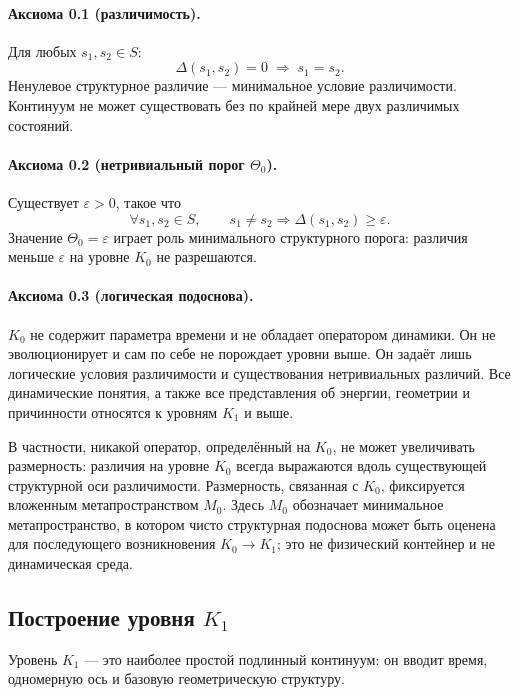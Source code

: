 \paragraph{Аксиома 0.1 (различимость).}
Для любых \(s_1,s_2 \in S\):
\[
    \Delta(s_1,s_2) = 0 \;\Rightarrow\; s_1 = s_2.
\]
Ненулевое структурное различие — минимальное условие различимости.
Континуум не может существовать без по крайней мере двух различимых состояний.

\paragraph{Аксиома 0.2 (нетривиальный порог \texorpdfstring{$\Theta_0$}{Theta\_0}).}
Существует \(\varepsilon > 0\), такое что
\[
    \forall s_1,s_2\in S,\qquad
    s_1 \neq s_2 \Rightarrow \Delta(s_1,s_2) \ge \varepsilon.
\]
Значение \(\Theta_0 = \varepsilon\) играет роль минимального структурного порога: различия меньше \(\varepsilon\) на уровне \(K_0\) не разрешаются.

\paragraph{Аксиома 0.3 (логическая подоснова).}
\(K_0\) не содержит параметра времени и не обладает оператором динамики.
Он не эволюционирует и сам по себе не порождает уровни выше.
Он задаёт лишь логические условия различимости и существования нетривиальных различий.
Все динамические понятия, а также все представления об энергии, геометрии и причинности
относятся к уровням \(K_1\) и выше.

В частности, никакой оператор, определённый на \(K_0\), не может увеличивать размерность:
различия на уровне \(K_0\) всегда выражаются вдоль существующей структурной оси различимости.
Размерность, связанная с \(K_0\), фиксируется вложенным метапространством \(M_0\).
Здесь \(M_0\) обозначает минимальное метапространство, в котором чисто структурная
подоснова может быть оценена для последующего возникновения \(K_0\to K_1\); это не
физический контейнер и не динамическая среда.

\subsection{Построение уровня \texorpdfstring{$K_1$}{K\_1}}

Уровень \(K_1\) — это наиболее простой подлинный континуум: он вводит время,
одномерную ось и базовую геометрическую структуру.

